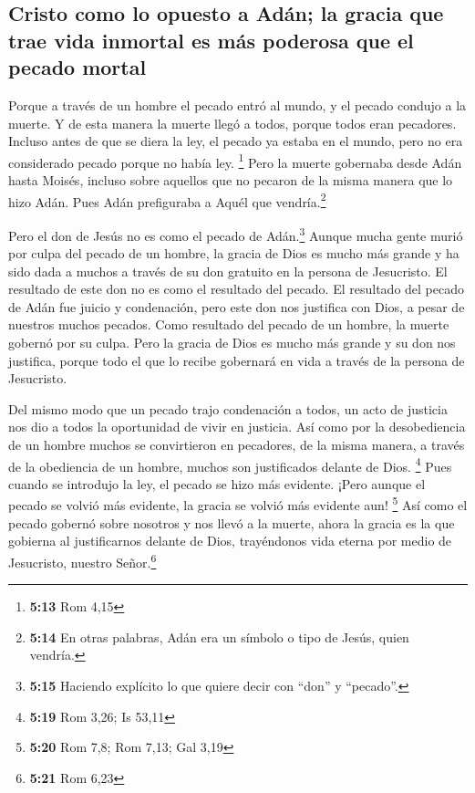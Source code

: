 \hypertarget{cristo-como-lo-opuesto-a-aduxe1n-la-gracia-que-trae-vida-inmortal-es-muxe1s-poderosa-que-el-pecado-mortal}{%
\subsection{Cristo como lo opuesto a Adán; la gracia que trae vida
inmortal es más poderosa que el pecado
mortal}\label{cristo-como-lo-opuesto-a-aduxe1n-la-gracia-que-trae-vida-inmortal-es-muxe1s-poderosa-que-el-pecado-mortal}}

 Porque a través de un hombre el pecado entró al mundo, y
el pecado condujo a la muerte. Y de esta manera la muerte llegó a todos,
porque todos eran pecadores.  Incluso antes de que se
diera la ley, el pecado ya estaba en el mundo, pero no era considerado
pecado porque no había ley. \footnote{\textbf{5:13} Rom 4,15}
 Pero la muerte gobernaba desde Adán hasta Moisés,
incluso sobre aquellos que no pecaron de la misma manera que lo hizo
Adán. Pues Adán prefiguraba a Aquél que vendría.\footnote{\textbf{5:14}
  En otras palabras, Adán era un símbolo o tipo de Jesús, quien vendría.}

 Pero el don de Jesús no es como el pecado de
Adán.\footnote{\textbf{5:15} Haciendo explícito lo que quiere decir con
  ``don'' y ``pecado''.} Aunque mucha gente murió por culpa del pecado
de un hombre, la gracia de Dios es mucho más grande y ha sido dada a
muchos a través de su don gratuito en la persona de Jesucristo.
 El resultado de este don no es como el resultado del
pecado. El resultado del pecado de Adán fue juicio y condenación, pero
este don nos justifica con Dios, a pesar de nuestros muchos pecados.
 Como resultado del pecado de un hombre, la muerte
gobernó por su culpa. Pero la gracia de Dios es mucho más grande y su
don nos justifica, porque todo el que lo recibe gobernará en vida a
través de la persona de Jesucristo.

 Del mismo modo que un pecado trajo condenación a todos,
un acto de justicia nos dio a todos la oportunidad de vivir en justicia.
 Así como por la desobediencia de un hombre muchos se
convirtieron en pecadores, de la misma manera, a través de la obediencia
de un hombre, muchos son justificados delante de Dios. \footnote{\textbf{5:19}
  Rom 3,26; Is 53,11}  Pues cuando se introdujo la ley,
el pecado se hizo más evidente. ¡Pero aunque el pecado se volvió más
evidente, la gracia se volvió más evidente aun! \footnote{\textbf{5:20}
  Rom 7,8; Rom 7,13; Gal 3,19}  Así como el pecado
gobernó sobre nosotros y nos llevó a la muerte, ahora la gracia es la
que gobierna al justificarnos delante de Dios, trayéndonos vida eterna
por medio de Jesucristo, nuestro Señor.\footnote{\textbf{5:21} Rom 6,23}

